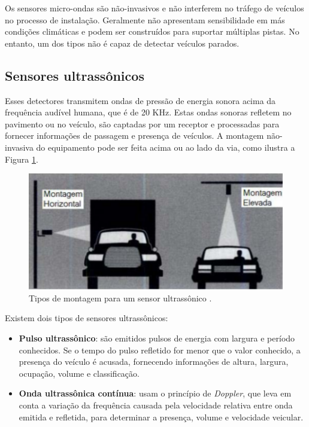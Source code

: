 Os sensores micro-ondas são não-invasivos e não interferem no tráfego de veículos no processo de instalação. Geralmente não apresentam sensibilidade em más condições climáticas e podem ser construídos para suportar múltiplas pistas. No entanto, um dos tipos não é capaz de detectar veículos parados.


\subsection{Sensores ultrassônicos} %
\label{sec:sensores_ultrass_nicos}

Esses detectores transmitem ondas de pressão de energia sonora acima da frequência audível humana, que é de 20 KHz. Estas ondas sonoras refletem no pavimento ou no veículo, são captadas por um receptor e processadas para fornecer informações de passagem e presença de veículos. A montagem não-invasiva do equipamento pode ser feita acima ou ao lado da via, como ilustra a Figura \ref{fig:ultrassonico}.

\begin{figure}[ht]
  \begin{center}
    \includegraphics[scale=.65]{imgs/ultrassonico.png}
  \end{center}
  \caption{Tipos de montagem para um sensor ultrassônico \citep{goldner:2009:misc}.}
  \label{fig:ultrassonico}
\end{figure}

Existem dois tipos de sensores ultrassônicos:

\begin{itemize}
  \item \textbf{Pulso ultrassônico}: são emitidos pulsos de energia com largura e período conhecidos. Se o tempo do pulso refletido for menor que o valor conhecido, a presença do veículo é acusada, fornecendo informações de altura, largura, ocupação, volume e classificação.
  \item \textbf{Onda ultrassônica contínua}: usam o princípio  de \textit{Doppler}, que leva em conta a variação da frequência causada pela velocidade relativa entre onda emitida e refletida, para determinar a presença, volume e velocidade veicular.
\end{itemize}

